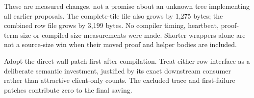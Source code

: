 These are measured changes, not a promise about an unknown tree implementing all earlier proposals. The complete-tile file also grows by 1,275 bytes; the combined row file grows by 3,199 bytes. No compiler timing, heartbeat, proof-term-size or compiled-size measurements were made. Shorter wrappers alone are not a source-size win when their moved proof and helper bodies are included.

Adopt the direct wall patch first after compilation. Treat either row interface as a deliberate semantic investment, justified by its exact downstream consumer rather than attractive client-only counts. The excluded trace and first-failure patches contribute zero to the final saving.
